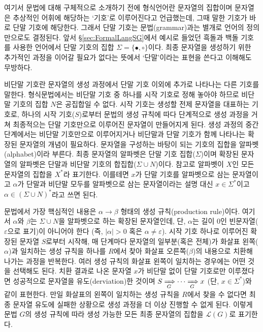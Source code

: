 \documentclass[b5paper,chapter,figtabcapt]{oblivoir}
\newcommand{\txtbullet}[0]{\ensuremath{\bullet}}
\newcommand{\txtcircle}[0]{\ensuremath{\circ}}
\begin{document}
여기서 문법에 대해 구체적으로 소개하기 전에 형식언어란 문자열의 집합이며
문자열은 추상적인 어휘에 해당하는 `기호'로 이루어진다고 언급했는데,
그때 말한 기호가 바로 단말 기호에 해당한다.
그래서 단말 기호는 문법(grammar)과는 별개로 언어의 정의만으로도 결정된다.
앞서 \S\ref{sec:FormalLangSG}에서 예시로 들었던 흑돌과 백돌 기호를 사용한
언어에서 단말 기호의 집합 $\Sigma = \{\txtbullet, \txtcircle\}$이다.
최종 문자열을 생성하기 위한 추가적인 과정을 이어갈 필요가 없다는 뜻에서
`단말'이라는 표현을 쓴다고 이해해도 무방하다.

비단말 기호란 문자열의 생성 과정에서 단말 기호 이외에 추가로 나타나는
다른 기호를 말한다. 형식문법에서는 비단말 기호 중 하나를 시작 기호로
정해 놓아야 하므로 비단말 기호의 집합 $N$은 공집합일 수 없다. 시작 기호는
생성할 전제 문자열을 대표하는 기호로, 하나의 시작 기호($S$)로부터 문법의
생성 규칙에 따다 단계적으로 생성 과정을 거쳐 최종적으는 단말 기호만으로
이루어진 문자열이 만들어지게 된다. 생성 과정의 중간 단계에서는 비단말 기호만으로
이루어지거나 비단말과 단말 기호가 함께 나타나는 확장된 문자열의 개념이 필요하다.
문자열을 구성하는 바탕이 되는 기호의 집합을 알파벳(alphabet)이라 부른다.
최종 문자열의 알파벳은 단말 기호 집합($\Sigma$)이며 확장된 문자열의 알파벳은
단말과 비단말 기호의 합집합($\Sigma\cup N$)이다. 참고로 알파벳이 $X$인
모든 문자열의 집합을 $X^*$라 표기한다. 이를테면
$x$가 단말 기호를 알파벳으로 삼는 문자열이고
$\alpha$가 단말과 비단말 모두를 알파벳으로 삼는 문자열이라는
설명 대신 $x\in\Sigma^*$이고 $\alpha\in(\Sigma\cup N)^*$라고 쓰면 된다.

문법에서 가장 핵심적인 내용은 $\alpha\to\beta$ 형태의 생성 규칙(production rule)이다.
여기서 $\alpha$와 $\beta$는  $\Sigma\cup N$을 알파벳으로 하는 확장된 문자열인데,
단, $\alpha$는 길이 0인 빈문자열($\varepsilon$으로 표기)이 아니어야 한다
(즉, $\lvert\alpha\rvert>0$ 혹은 $\alpha\neq\varepsilon$).
시작 기호 하나로 이루어진 확장된 문자열 $S$로부터 시작해, 매 단계마다
문자열의 일부분(혹은 전체)가 화살표 왼쪽($\alpha$)과 일치하는 생성 규칙을
하나를 $R$에서 찾아 화살표 오른쪽($\beta$)의 내용으로 치환해 나가는 과정을
반복한다. 여러 생성 규칙의 화살표 왼쪽이 일치하는 경우에는 어떤 것을 선택해도 된다.
치환 결과로 나온 문자열 $x$가 비단말 없이 단말 기호로만 이루졌다면
성공적으로 문자열을 유도(derviation)한 것이며
$S\xRightarrow[\,G]{} \cdots \xRightarrow[\,G]{} x$ (단, $x\in\Sigma^*$)와 같이 표현한다.
만일 화살표의 왼쪽이 일치하는 생성 규칙을 $R$에서 찾을 수 없다면
최종 문자열 유도에 실패한 상황으로 생성 과정을 더 이상 진행할 수 없게 된다.
이렇게 문법 $G$의 생성 규칙에 따라 생성 가능한 모든 최종 문자열의 집합을
$\mathcal{L}(G)$로 표기한다.
\end{document}
